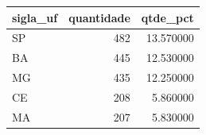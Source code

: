 \begin{tabular}{lrr}
\toprule
sigla_uf & quantidade & qtde_pct \\
\midrule
SP & 482 & 13.570000 \\
BA & 445 & 12.530000 \\
MG & 435 & 12.250000 \\
CE & 208 & 5.860000 \\
MA & 207 & 5.830000 \\
\bottomrule
\end{tabular}
